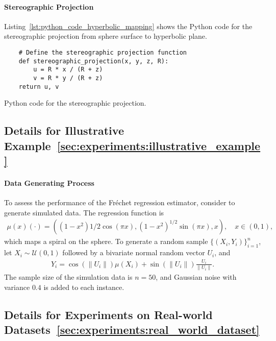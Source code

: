 \paragraph{Stereographic Projection}
Listing~\ref{lst:python_code_hyperbolic_mapping} shows the Python code for the stereographic projection from sphere surface to hyperbolic plane.

\begin{listing}[H]
    \begin{verbatim}    
    # Define the stereographic projection function
    def stereographic_projection(x, y, z, R):
        u = R * x / (R + z)
        v = R * y / (R + z)
    return u, v
    \end{verbatim}
    \caption{Python code for the stereographic projection.}
    \label{lst:python_code_hyperbolic_mapping}
\end{listing}

\subsection{Details for Illustrative Example~\ref{sec:experiments:illustrative_example}}

\paragraph{Data Generating Process}
To assess the performance of the Fréchet regression estimator, consider to generate simulated data.
The regression function is
\begin{align*}
    \mu(x)(\cdot) = ((1 - x^2){1/2}\cos(\pi x), (1 - x^2)^{1/2}\sin(\pi x), x), \quad x \in (0, 1),
\end{align*}
which maps a spiral on the sphere.
To generate a random sample $\{(X_i, Y_i)\}^n_{i=1}$, let $X_i \sim \mathcal{U}(0, 1)$ followed by a bivariate normal
random vector $U_i$, and
\begin{align*}
    Y_i = \cos(\|U_i\|)\mu(X_i) + \sin(\|U_i\|)\frac{U_i}{\|U_i\|}.
\end{align*}
The sample size of the simulation data is $n = 50$, and Gaussian noise with variance $0.4$ is added to each instance.

\subsection{Details for Experiments on Real-world Datasets~\ref{sec:experiments:real_world_dataset}}

